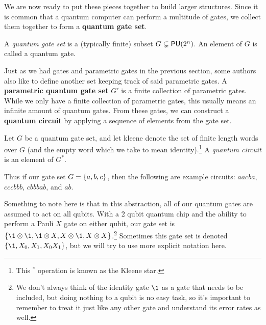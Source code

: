 We are now ready to put these pieces together to build larger structures.
Since it is common that a quantum computer can perform a multitude of gates, we collect them together to form a \textbf{quantum gate set}.
\begin{definition}
    A \emph{quantum gate set} is a (typically finite) subset $G \subsetneq \mathsf{PU} (2^n)$. An element of $G$ is called a quantum gate.
\end{definition}
Just as we had gates and parametric gates in the previous section, some authors also like to define another set keeping track of said parametric gates.
A \textbf{parametric quantum gate set} $G'$ is a finite collection of parametric gates.
While we only have a finite collection of parametric gates, this usually means an infinite amount of quantum gates.
From these gates, we can construct a \textbf{quantum circuit} by applying a sequence of elements from the gate set.
\begin{definition}\label{def:circuit}
    Let $G$ be a quantum gate set, and let \gls{kleene} denote the set of finite length words over $G$ (and the empty word which we take to mean identity).\footnote{This $^*$ operation is known as the Kleene\footnotemark{} star.}
    A \emph{quantum circuit} is an element of $G^*$.
\end{definition}
Thus if our gate set $G = \qty{a, b, c}$, then the following are example circuits: $aacba$, $cccbbb$, $cbbbab$, and $ab$.

Something to note here is that in this abstraction, all of our quantum gates are assumed to act on all qubits.
With a 2 qubit quantum chip and the ability to perform a Pauli $X$ gate on either qubit, our gate set is $\qty{\1\otimes \1, \1\otimes X, X\otimes \1, X\otimes X}$.\footnote{We don't always think of the identity gate $\1$ as a gate that needs to be included, but doing nothing to a qubit is no easy task, so it's important to remember to treat it just like any other gate and understand its error rates as well.}
Sometimes this gate set is denoted $\qty{\1, X_0, X_1, X_0X_1}$, but we will try to use more explicit notation here.

